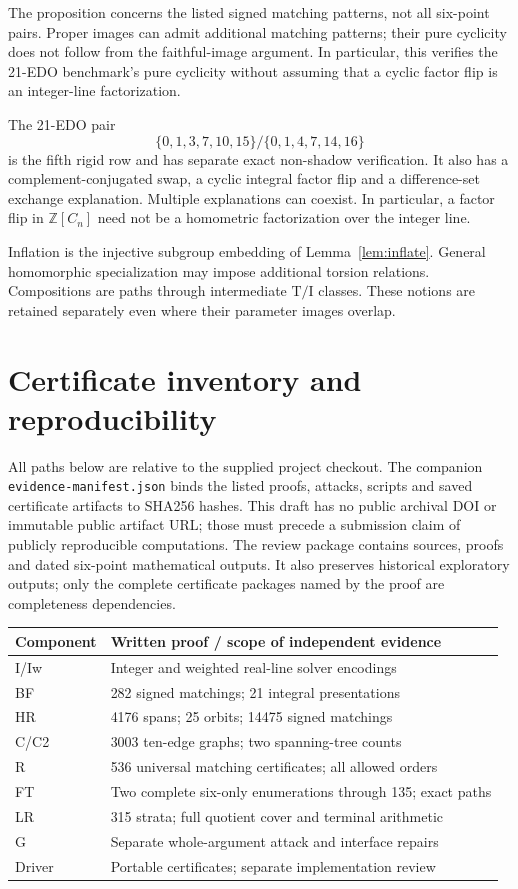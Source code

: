 \documentclass[11pt]{article}
\theoremstyle{remark}
\newcommand{\Z}{\mathbb Z}
\newcommand{\TI}{\mathrm{T/I}}
\newcommand{\code}[1]{\nolinkurl{#1}}
\begin{document}
The proposition concerns the listed signed matching patterns, not all
six-point pairs. Proper images can admit additional matching patterns;
their pure cyclicity does not follow from the faithful-image argument.
In particular, this verifies the 21-EDO benchmark's pure cyclicity without
assuming that a cyclic factor flip is an integer-line factorization.

The 21-EDO pair
\[
\{0,1,3,7,10,15\}/\{0,1,4,7,14,16\}
\]
is the fifth rigid row and has separate exact non-shadow verification.
It also has a complement-conjugated swap, a cyclic integral factor flip
and a difference-set exchange explanation. Multiple explanations can
coexist. In particular, a factor flip in $\Z[C_n]$ need not be a
homometric factorization over the integer line.

Inflation is the injective subgroup embedding of Lemma~\ref{lem:inflate}.
General homomorphic specialization may impose additional torsion
relations. Compositions are paths through intermediate $\TI$ classes.
These notions are retained separately even where their parameter images
overlap.

\section{Certificate inventory and reproducibility}\label{sec:certificates}
All paths below are relative to the supplied project checkout. The companion
\code{evidence-manifest.json} binds the listed proofs, attacks, scripts and
saved certificate artifacts to SHA256 hashes. This draft has no public
archival DOI or immutable public artifact URL; those must precede a submission
claim of publicly reproducible computations. The review package contains
sources, proofs and dated six-point mathematical outputs. It also preserves
historical exploratory outputs; only the complete certificate packages named
by the proof are completeness dependencies.

\begin{center}\small
\begin{tabular}{ll}
\toprule
Component & Written proof / scope of independent evidence\\
\midrule
I/Iw & Integer and weighted real-line solver encodings\\
BF & 282 signed matchings; 21 integral presentations\\
HR & 4176 spans; 25 orbits; 14475 signed matchings\\
C/C2 & 3003 ten-edge graphs; two spanning-tree counts\\
R & 536 universal matching certificates; all allowed orders\\
FT & Two complete six-only enumerations through 135; exact paths\\
LR & 315 strata; full quotient cover and terminal arithmetic\\
G & Separate whole-argument attack and interface repairs\\
Driver & Portable certificates; separate implementation review\\
\bottomrule
\end{tabular}
\end{center}
\end{document}
